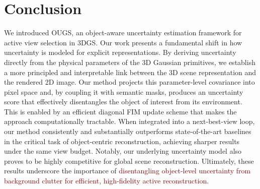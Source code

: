 \documentclass{egpubl}
\newcommand{\pname}[1]{{OUGS}}
\newcommand{\rev}[1]{\textcolor{darkred}{#1}}
\begin{document}
\section{Conclusion}
We introduced \pname{}, an object-aware uncertainty estimation framework for active view selection in 3DGS. Our work presents a fundamental shift in how uncertainty is modeled for explicit representations. By deriving uncertainty directly from the physical parameters of the 3D Gaussian primitives, we establish a more principled and interpretable link between the 3D scene representation and the rendered 2D image.
Our method projects this parameter-level covariance into pixel space and, by coupling it with semantic masks, produces an uncertainty score that effectively disentangles the object of interest from its environment. This is enabled by an efficient diagonal FIM update scheme that makes the approach computationally tractable. When integrated into a next-best-view loop, our method consistently and substantially outperforms state-of-the-art baselines in the critical task of object-centric reconstruction, achieving sharper results under the same view budget. Notably, our underlying uncertainty model also proves to be highly competitive for global scene reconstruction. Ultimately, these results underscore the importance of \rev{disentangling object-level uncertainty from background clutter for efficient, high-fidelity active reconstruction}.

\clearpage
 
       


\newpage
\appendix

\end{document}
